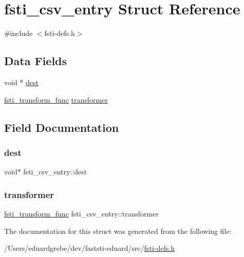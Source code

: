 \hypertarget{structfsti__csv__entry}{}\section{fsti\+\_\+csv\+\_\+entry Struct Reference}
\label{structfsti__csv__entry}


{\ttfamily \#include $<$fsti-\/defs.\+h$>$}

\subsection*{Data Fields}
\begin{DoxyCompactItemize}
\item 
void $\ast$ \mbox{\hyperlink{structfsti__csv__entry_a6a86c8654ea3c73fcd2af1a9e35dfa3a}{dest}}
\item 
\mbox{\hyperlink{fsti-defs_8h_ae5b65c9cc706efded6267d78bbf70593}{fsti\+\_\+transform\+\_\+func}} \mbox{\hyperlink{structfsti__csv__entry_aafde0fea0a3c1bb497a45553c300bd79}{transformer}}
\end{DoxyCompactItemize}


\subsection{Field Documentation}
\mbox{\label{structfsti__csv__entry_a6a86c8654ea3c73fcd2af1a9e35dfa3a}} 
\subsubsection{\texorpdfstring{dest}{dest}}
{\footnotesize\ttfamily void$\ast$ fsti\+\_\+csv\+\_\+entry\+::dest}

\mbox{\label{structfsti__csv__entry_aafde0fea0a3c1bb497a45553c300bd79}} 
\subsubsection{\texorpdfstring{transformer}{transformer}}
{\footnotesize\ttfamily \mbox{\hyperlink{fsti-defs_8h_ae5b65c9cc706efded6267d78bbf70593}{fsti\+\_\+transform\+\_\+func}} fsti\+\_\+csv\+\_\+entry\+::transformer}



The documentation for this struct was generated from the following file\+:\begin{DoxyCompactItemize}
\item 
/\+Users/eduardgrebe/dev/faststi-\/eduard/src/\mbox{\hyperlink{fsti-defs_8h}{fsti-\/defs.\+h}}\end{DoxyCompactItemize}
